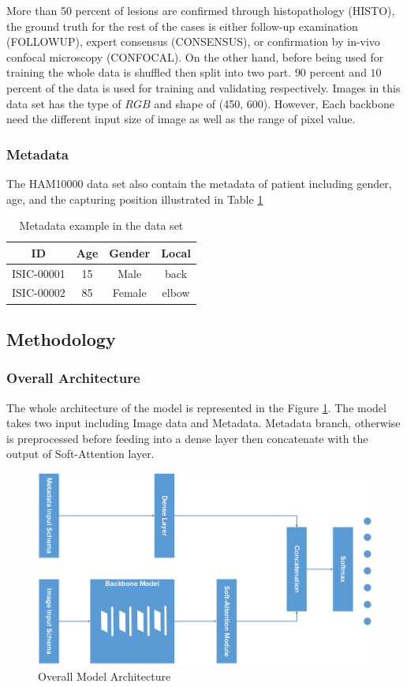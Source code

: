 \documentclass[sensors,article,submit,pdftex,moreauthors]{Definitions/mdpi}
\begin{document}
More than 50 percent of lesions are confirmed through histopathology (HISTO), the ground truth for the rest of the cases is either follow-up examination (FOLLOWUP), expert consensus (CONSENSUS), or confirmation by in-vivo confocal microscopy (CONFOCAL). On the other hand, before being used for training the whole data is shuffled then split into two part. $90$ percent and $10$ percent of the data is used for training and validating respectively. Images in this data set has the type of $RGB$ and shape of (450, 600). However, Each backbone need the different input size of image as well as the range of pixel value.

\subsubsection{Metadata}
The HAM10000 data set \cite{10417} also contain the metadata of patient including gender, age, and the capturing position illustrated in Table \ref{table:metadata sample}
\begin{table}[H]
	\centering
	\begin{tabular}{|c c c c |} 
		\hline
		ID & Age & Gender & Local\\ 
		\hline
		ISIC-00001 & 15 & Male & back\\
		\hline
		ISIC-00002 & 85 & Female & elbow\\
		\hline
	\end{tabular}
	\caption{Metadata example in the data set}
	\label{table:metadata sample}
\end{table}
\subsection{Methodology}
\subsubsection{Overall Architecture}
The whole architecture of the model is represented in the Figure \ref{fig:main-model}. The model takes two input including Image data and Metadata. Metadata branch, otherwise is preprocessed before feeding into a dense layer then concatenate with the output of Soft-Attention layer. 

\begin{figure}[H]
	\centering
	\includegraphics[width=0.5\linewidth]{Definitions/MainModel - Model Form}
	\caption{Overall Model Architecture}
	\label{fig:main-model}
\end{figure}
\end{document}
